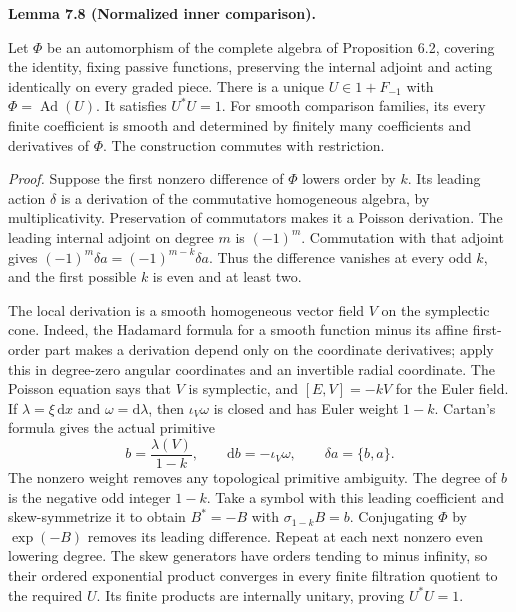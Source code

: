 \documentclass[
  english,
  11pt,
  reqno]{amsart}
\makeatletter
\newcommand{\pandocstatementheading}[1]{%
  \par\if@nobreak\else
    \addpenalty{\@beginparpenalty}%
    \addvspace{.5\baselineskip plus .2\baselineskip minus .2\baselineskip}%
  \fi
  {\normalfont\bfseries #1\par}%
  \nobreak\@afterindenttrue\@afterheading
}
\makeatother
\begin{document}
\pandocstatementheading{\leavevmode{}\label{lem:online-normalized-inner-rigidity}Lemma 7.8 (Normalized inner comparison).}

Let \(\Phi\) be an automorphism of the complete algebra of Proposition
6.2, covering the identity, fixing passive functions, preserving the
internal adjoint and acting identically on every graded piece. There is
a unique \(U\in1+F_{-1}\) with \(\Phi=\operatorname{Ad}(U)\). It
satisfies \(U^*U=1\). For smooth comparison families, its every finite
coefficient is smooth and determined by finitely many coefficients and
derivatives of \(\Phi\). The construction commutes with restriction.

\emph{Proof.} Suppose the first nonzero difference of \(\Phi\) lowers
order by \(k\). Its leading action \(\delta\) is a derivation of the
commutative homogeneous algebra, by multiplicativity. Preservation of
commutators makes it a Poisson derivation. The leading internal adjoint
on degree \(m\) is \((-1)^m\). Commutation with that adjoint gives
\((-1)^m\delta a=(-1)^{m-k}\delta a\). Thus the difference vanishes at
every odd \(k\), and the first possible \(k\) is even and at least two.

The local derivation is a smooth homogeneous vector field \(V\) on the
symplectic cone. Indeed, the Hadamard formula for a smooth function
minus its affine first-order part makes a derivation depend only on the
coordinate derivatives; apply this in degree-zero angular coordinates
and an invertible radial coordinate. The Poisson equation says that
\(V\) is symplectic, and \([E,V]=-kV\) for the Euler field. If
\(\lambda=\xi\,\mathrm dx\) and \(\omega=\mathrm d\lambda\), then
\(\iota_V\omega\) is closed and has Euler weight \(1-k\). Cartan's
formula gives the actual primitive%
 \[
b=\frac{\lambda(V)}{1-k},\qquad
\mathrm db=-\iota_V\omega,\qquad
\delta a=\{b,a\}.
\] The nonzero weight removes any topological primitive ambiguity. The
degree of \(b\) is the negative odd integer \(1-k\). Take a symbol with
this leading coefficient and skew-symmetrize it to obtain \(B^*=-B\)
with \(\sigma_{1-k}B=b\). Conjugating \(\Phi\) by \(\exp(-B)\) removes
its leading difference. Repeat at each next nonzero even lowering
degree. The skew generators have orders tending to minus infinity, so
their ordered exponential product converges in every finite filtration
quotient to the required \(U\). Its finite products are internally
unitary, proving \(U^*U=1\).
\end{document}
